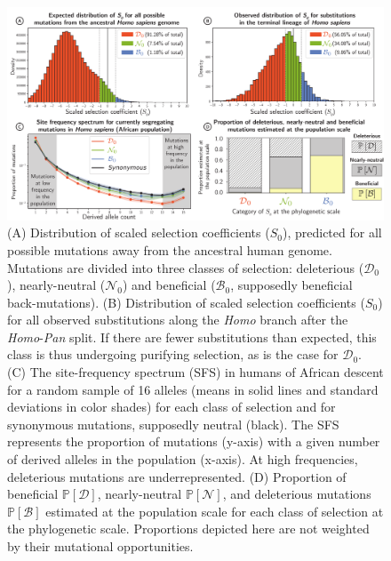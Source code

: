 \documentclass{article}
\newcommand{\proba}{\mathbb{P}}
\newcommand{\Sphy}{S_{0}}
\newcommand{\SphyDel}{\mathcal{D}_0}
\newcommand{\SphyNeu}{\mathcal{N}_0}
\newcommand{\SphyBen}{\mathcal{B}_0}
\newcommand{\SpopDel}{\mathcal{D}}
\newcommand{\SpopNeu}{\mathcal{N}}
\newcommand{\SpopBen}{\mathcal{B}}
\newcommand{\ProbaPopDel}{\proba [ \SpopDel]}
\newcommand{\ProbaPopNeu}{\proba [ \SpopNeu ]}
\newcommand{\ProbaPopBen}{\proba [ \SpopBen ]}
\begin{document}
    \begin{figure}[!ht]
        \centering
        \includegraphics[width=\textwidth, page=1] {artworks/figure.homo-afr-results}
        \caption{
            (A) Distribution of scaled selection coefficients ($\Sphy$), predicted for all possible mutations away from the ancestral human genome.
            Mutations are divided into three classes of selection: deleterious ($\SphyDel$), nearly-neutral ($\SphyNeu$) and beneficial ($\SphyBen$, supposedly beneficial back-mutations).
            (B) Distribution of scaled selection coefficients ($\Sphy$) for all observed substitutions along the \textit{Homo} branch after the \textit{Homo}-\textit{Pan} split.
            If there are fewer substitutions than expected, this class is thus undergoing purifying selection, as is the case for $\SphyDel$.
            (C) The site-frequency spectrum (SFS) in humans of African descent for a random sample of 16 alleles (means in solid lines and standard deviations in color shades) for each class of selection and for synonymous mutations, supposedly neutral (black). The SFS represents the proportion of mutations (y-axis) with a given number of derived alleles in the population (x-axis).
            At high frequencies, deleterious mutations are underrepresented.
            (D) Proportion of beneficial $\ProbaPopDel$, nearly-neutral $\ProbaPopNeu$, and deleterious mutations $\ProbaPopBen$ estimated at the population scale for each class of selection at the phylogenetic scale. Proportions depicted here are not weighted by their mutational opportunities.
        }
        \label{fig:homo-afr-results}
    \end{figure}
\end{document}
